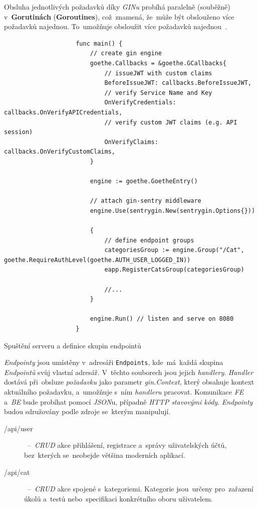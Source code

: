 \documentclass[11pt,a4paper]{report}
\let\oldacrshort\acrshort
\renewcommand{\acrshort}[1]{\emph{\normalsize\color[rgb]{0,0,0}\noindent\oldacrshort{#1}}}
\begin{document}
            Obsluha jednotlivých požadavků díky \emph{GINu} probíhá paralelně (souběžně) v~\textbf{Gorutinách} (\textbf{Goroutines}), což~znamená, že~může být obslouženo více požadavků najednou. To~umožňuje obsloužit více požadavků najednou~\cite{effective_go}.

            \begin{code}
                \begin{verbatim}
                    func main() {
                    	// create gin engine
                    	goethe.Callbacks = &goethe.GCallbacks{
                    		// issueJWT with custom claims
                    		BeforeIssueJWT: callbacks.BeforeIssueJWT,
                    		// verify Service Name and Key
                    		OnVerifyCredentials: callbacks.OnVerifyAPICredentials,
                    		// verify custom JWT claims (e.g. API session)
                    		OnVerifyClaims: callbacks.OnVerifyCustomClaims,
                    	}
                    
                    	engine := goethe.GoetheEntry()
                    
                    	// attach gin-sentry middleware
                    	engine.Use(sentrygin.New(sentrygin.Options{}))
                    
                    	{
                    		// define endpoint groups
                    		categoriesGroup := engine.Group("/Cat", goethe.RequireAuthLevel(goethe.AUTH_USER_LOGGED_IN))
                    		eapp.RegisterCatsGroup(categoriesGroup)
                      
                            //...
                    	}
                    
                    	engine.Run() // listen and serve on 8080
                    }
                \end{verbatim}
                \caption{Spuštění serveru a definice skupin endpointů}
                \label{go:enginerun}
            \end{code}

            \emph{Endpointy} jsou umístěny v~adresáři \texttt{Endpoints}, kde~má~každá skupina \emph{Endpointů} svůj vlastní adresář. V~těchto souborech jsou jejich \emph{handlery}. \emph{Handler} dostává při~obsluze \emph{požadavku} jako parametr \emph{gin.Context}, který obsahuje kontext aktuálního požadavku, a~umožňuje s~ním \emph{handleru} pracovat. Komunikace \acrshort{FE} a~\acrshort{BE} bude probíhat pomocí \emph{JSON}u, případně \emph{HTTP stavovými kódy}. \emph{Endpointy} budou sdružovány podle zdroje se~kterým manipulují.
            \begin{description}
                \item[/api/user]~--~\emph{CRUD} akce přihlášení, registrace a~správy uživatelských účtů, bez~kterých se~neobejde většina moderních aplikací.
                \item[/api/cat]~--~\emph{CRUD} akce spojené s~kategoriemi. Kategorie jsou~určeny pro~zařazení úkolů a~testů nebo~specifikaci konkrétního oboru uživatelem.
            \end{description}
\end{document}
